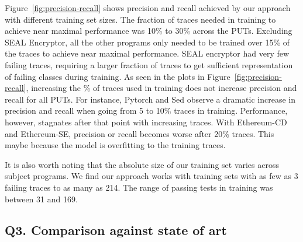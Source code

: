 

Figure~\ref{fig:precision-recall} shows precision and recall achieved by our approach with different training set sizes.
The fraction of traces needed in training to achieve near maximal performance was 10\% to 30\% across the PUTs.
Excluding SEAL Encryptor, all the other programs only needed to be trained over 15\% of the traces to achieve near maximal performance. SEAL encryptor had very few failing traces, requiring a larger fraction of traces to get sufficient representation of failing classes during training. 
As seen in the plots in Figure~\ref{fig:precision-recall}, increasing the \% of traces used in training does not increase precision and recall for all PUTs. For instance, Pytorch and Sed observe a dramatic increase in precision and recall  when going from 5 to 10\% traces in training. Performance, however, stagnates after that point with increasing traces. With Ethereum-CD and Ethereum-SE, precision or recall becomes worse after 20\% traces. This maybe because the model is overfitting to the training traces.  

It is also worth noting that the absolute size of our training set varies across subject programs. We find our approach works with training sets with as few as 3 failing traces to as many as 214. The range of passing tests in training was between 31 and 169.
\subsection{Q3. Comparison against state of art}
\label{sec:q3}

